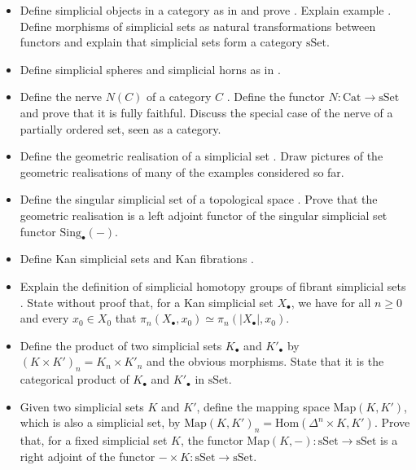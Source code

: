 \documentclass{amsart}
\theoremstyle{definition}
\theoremstyle{remark}
\newcommand{\ra}{\rightarrow}
\begin{document}
\begin{itemize}
\item Define simplicial objects in a category as in \cite[8.1.4]{Weibel} and prove \cite[8.1.1-3]{Weibel}. Explain example \cite[8.1.5]{Weibel}. Define morphisms of simplicial sets as natural transformations between functors and explain that simplicial sets form a category $\mathrm{sSet}$.
\item Define simplicial spheres and simplicial horns as in \cite[5.1-3]{RiehlSS}.
\item Define the nerve $N(C)$ of a category $C$ \cite[Example 1.2]{Groth}. Define the functor $N:\mathrm{Cat}\ra \mathrm{sSet}$ and prove that it is fully faithful. Discuss the special case of the nerve of a partially ordered set, seen as a category.%
\item Define the geometric realisation of a simplicial set \cite[8.1.6]{Weibel}. Draw pictures of the geometric realisations of many of the examples considered so far.
\item Define the singular simplicial set of a topological space \cite[8.2.4]{Weibel}. Prove that the geometric realisation is a left adjoint functor of the singular simplicial set functor $\mathrm{Sing}_{\bullet}(-)$.
\item Define Kan simplicial sets \cite[8.2.7]{Weibel} and Kan fibrations \cite[Ex.2.0.0.1]{HTT}.
\item Explain the definition of simplicial homotopy groups of fibrant simplicial sets \cite[8.3.1]{Weibel}. State without proof that, for a Kan simplicial set $X_{\bullet}$, we have for all $n\geq 0$ and every $x_{0}\in X_{0}$ that $\pi_{n}(X_{\bullet},x_{0})\simeq \pi_{n}(|X_{\bullet}|,x_{0})$.
\item Define the product of two simplicial sets $K_{\bullet}$ and $K'_{\bullet}$ by $(K\times K')_{n}=K_{n}\times K'_{n}$ and the obvious morphisms. State that it is the categorical product of $K_{\bullet}$ and $K'_{\bullet}$ in $\mathrm{sSet}$.
\item Given two simplicial sets $K$ and $K'$, define the mapping space $\mathrm{Map}(K,K')$, which is also a simplicial set, by $\mathrm{Map}(K,K')_{n}=\mathrm{Hom}(\Delta^{n}\times K,K')$. Prove that, for a fixed simplicial set $K$, the functor $\mathrm{Map}(K,-):\mathrm{sSet}\rightarrow \mathrm{sSet}$ is a right adjoint of the functor $-\times K:\mathrm{sSet}\rightarrow \mathrm{sSet}$.

\end{itemize}
\end{document}
